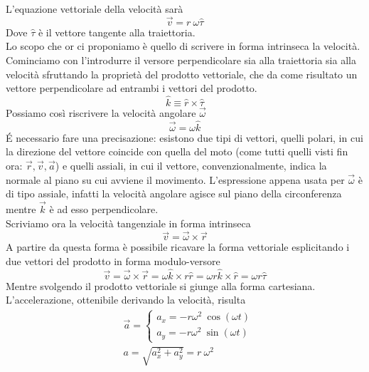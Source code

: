 L'equazione vettoriale della velocità  sarà
\begin{equation*}
\vec{v} = r\ \omega \hat{\tau}
\end{equation*}
Dove $\hat{\tau}$ è il vettore tangente alla traiettoria.\\
Lo scopo che or ci proponiamo è quello di scrivere in forma intrinseca la velocità. Cominciamo con l'introdurre il versore perpendicolare sia alla traiettoria sia alla velocità sfruttando la proprietà del prodotto vettoriale, che da come risultato un vettore perpendicolare ad entrambi i vettori del prodotto.
\begin{equation*}
	\hat{k} \equiv \hat{r} \times \hat{\tau}
\end{equation*}
Possiamo così riscrivere la velocità angolare $\vec{\omega}$
\begin{equation*}
	\vec{\omega} = \omega \hat{k}
\end{equation*}
\'{E} necessario fare una precisazione: esistono due tipi di vettori, quelli polari, in cui la direzione del vettore coincide con quella del moto (come tutti quelli visti fin ora: $\vec{r}, \vec{v}, \vec{a}$) e quelli assiali, in cui il vettore, convenzionalmente, indica la normale al piano su cui avviene il movimento. L'espressione appena usata per $\vec{\omega}$ è di tipo assiale, infatti la velocità angolare agisce sul piano della circonferenza mentre $\vec{k}$ è ad esso perpendicolare.\\
Scriviamo ora la velocità tangenziale in forma intrinseca
 \begin{equation*}
 	\vec{v} = \vec{\omega} \times \vec{r}
 \end{equation*}
A partire da questa forma è possibile ricavare la forma vettoriale esplicitando i due vettori del prodotto in forma modulo-versore
 \begin{equation*}
	\vec{v} = \vec{\omega} \times \vec{r} = \omega \hat{k} \times r \hat{r} = \omega r \hat{k} \times \hat{r} = \omega r \hat{\tau}
\end{equation*}
Mentre svolgendo il prodotto vettoriale si giunge alla forma cartesiana. \\
L'accelerazione, ottenibile derivando la velocità, risulta 
\begin{align*}
&\vec{a}=
	\begin{cases}
		a_x = -r \omega^2\ \cos(\omega t)\\
		a_y = -r \omega^2\ \sin(\omega t)
	\end{cases}\\
&a = \sqrt{a_x^2 + a_y^2}= r\ \omega^2
\end{align*}
